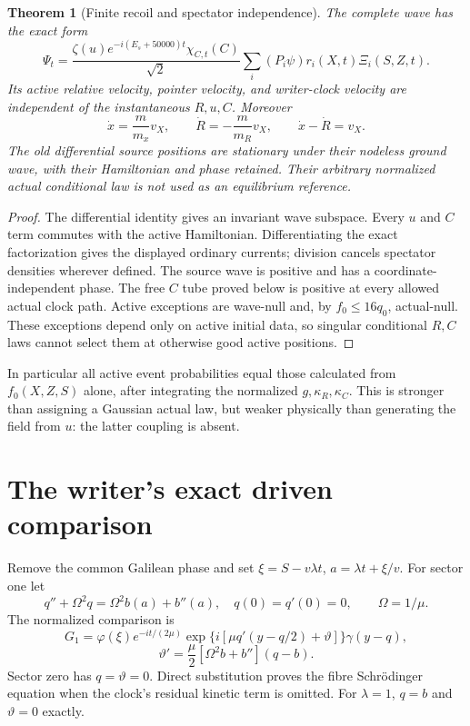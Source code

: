 \documentclass[11pt]{article}
\newtheorem{theorem}{Theorem}[section]
\theoremstyle{definition}\newtheorem{definition}[theorem]{Definition}
\theoremstyle{remark}\newtheorem{remark}[theorem]{Remark}
\begin{document}
\begin{theorem}[Finite recoil and spectator independence]\label{pa:thm:recoil}
The complete wave has the exact form
\[
 \Psi_t=\frac{\zeta(u)e^{-i(E_s+50000)t}\chi_{C,t}(C)}{\sqrt2}
 \sum_i(P_i\psi)r_i(X,t)\Xi_i(S,Z,t).
\]
Its active relative velocity, pointer velocity, and writer-clock velocity are independent of the instantaneous $R,u,C$. Moreover
\[
 \dot x=\frac m{m_x}v_X,\qquad
 \dot R=-\frac m{m_R}v_X,\qquad \dot x-\dot R=v_X.
\]
The old differential source positions are stationary under their nodeless ground wave, with their Hamiltonian and phase retained. Their arbitrary normalized actual conditional law is not used as an equilibrium reference.
\end{theorem}
\begin{proof}
The differential identity gives an invariant wave subspace. Every $u$ and $C$ term commutes with the active Hamiltonian. Differentiating the exact factorization gives the displayed ordinary currents; division cancels spectator densities wherever defined. The source wave is positive and has a coordinate-independent phase. The free $C$ tube proved below is positive at every allowed actual clock path. Active exceptions are wave-null and, by $f_0\le16q_0$, actual-null. These exceptions depend only on active initial data, so singular conditional $R,C$ laws cannot select them at otherwise good active positions.
\end{proof}

In particular all active event probabilities equal those calculated from $f_0(X,Z,S)$ alone, after integrating the normalized $g,\kappa_R,\kappa_C$. This is stronger than assigning a Gaussian actual law, but weaker physically than generating the field from $u$: the latter coupling is absent.

\section{The writer's exact driven comparison}
Remove the common Galilean phase and set $\xi=S-v\lambda t$, $a=\lambda t+\xi/v$. For sector one let
\[
 q''+\Omega^2q=\Omega^2b(a)+b''(a),\quad q(0)=q'(0)=0,
 \qquad\Omega=1/\mu.
\]
The normalized comparison is
\[
 G_1=\varphi(\xi)e^{-it/(2\mu)}
 \exp\{i[\mu q'(y-q/2)+\vartheta]\}\gamma(y-q),
\]
\[
 \vartheta'=\frac\mu2[\Omega^2b+b''](q-b).
\]
Sector zero has $q=\vartheta=0$. Direct substitution proves the fibre Schr\"odinger equation when the clock's residual kinetic term is omitted. For $\lambda=1$, $q=b$ and $\vartheta=0$ exactly.
\end{document}
